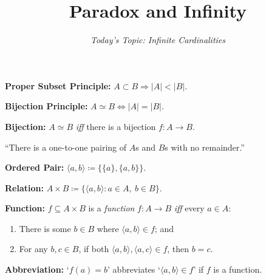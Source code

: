 \documentclass[handout]{beamer}
\title[Short title]{\LARGE Paradox and Infinity} %
\author{\it Today's Topic: Infinite Cardinalities} %
\date{} %
\newcommand{\tuple}[1]{\langle#1\rangle} %
\renewcommand{\tuple}[1]{\langle#1\rangle} %
\newcommand{\set}[1]{\lbrace#1\rbrace} %
\newcommand{\abs}[1]{|#1|} %
\begin{document}
\begin{frame}
\titlepage %
\end{frame}









\begin{frame}

  \textbf{Proper Subset Principle:} $A\subset B \Rightarrow \abs{A}<\abs{B}$.
  \vspace{.2in}
  \pause

  \textbf{Bijection Principle:} $A\simeq B \Leftrightarrow \abs{A}=\abs{B}$.
  \vspace{.2in}
  \pause

  \textbf{Bijection:} $A\simeq B$ \textit{iff} there is a bijection $f: A \to B$.
  \vspace{.2in}
  \pause

  ``There is a one-to-one pairing of $A$s and $B$s with no remainder.''

\end{frame}




\begin{frame}

  \textbf{Ordered Pair:} $\tuple{a,b}\coloneq \set{\set{a},\set{a,b}}$.
  \vspace{.2in}
  \pause

  \textbf{Relation:} $A\times B\coloneq \set{\tuple{a,b}:a\in A,\ b\in B}$.
  \vspace{.2in}
  \pause

  \textbf{Function:} $f\subseteq A\times B$ is a \textit{function} $f: A\to B$ \textit{iff} every $a\in A$:\\ 
    \begin{enumerate}
      \item There is some $b\in B$ where $\tuple{a,b}\in f$; and
      \item For any $b,c\in B$, if both $\tuple{a,b},\tuple{a,c}\in f$, then $b=c$. 
    \end{enumerate}
  \vspace{.2in}
  \pause

  \textbf{Abbreviation:} `$f(a)=b$' abbreviates `$\tuple{a,b}\in f$' if $f$ is a function. 
  \vspace{.2in}

\end{frame}
\end{document}
